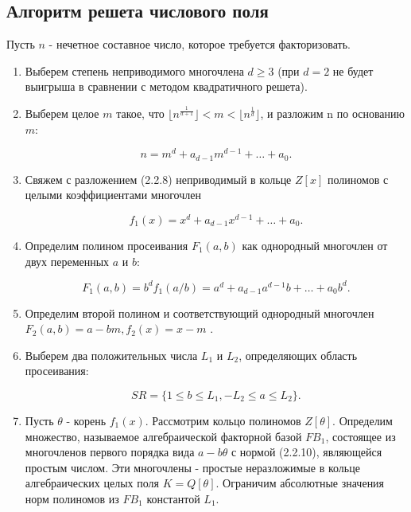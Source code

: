   \subsection{Алгоритм решета числового поля}
  Пусть {$n$} - нечетное составное число, которое требуется факторизовать.
  
    \begin{enumerate}
      \item Выберем степень неприводимого многочлена {$d \ge 3$} (при {$d = 2$} не будет выигрыша в сравнении с методом квадратичного решета).
      \item Выберем целое {$m$} такое, что {$\lfloor n^\frac{1}{d+1} \rfloor < m < \lfloor n^\frac{1}{d} \rfloor$}, и разложим n по 
	основанию {$m$}:
	
	  \begin{equation} \label{eq:prime-fact-nmd}
	   n = m^d + a_{d-1}m^{d-1} + \dots + a_0.
	  \end{equation}

      \item Свяжем с разложением (2.2.8) неприводимый в кольце {$Z[x]$} полиномов с целыми коэффициентами многочлен
      
	\begin{equation} \label{eq:prime-fact-f1xd}
	 f_1(x)=x^d + a_{d-1}x^{d-1} + \dots + a_0.
	\end{equation}

      \item Определим полином просеивания {$F_1(a,b)$} как однородный многочлен от двух переменных {$a$} и {$b$}:
      
	\begin{equation} \label{eq:prime-fact-F1ab}
	 F_1(a,b) = b^d f_1(a/b) = a^d + a_{d-1}a^{d-1}b + \dots + a_0 b^d.
	\end{equation}

      \item Определим второй полином и соответствующий однородный многочлен {$F_2(a,b)=a-bm, f_2(x)=x-m$} .
      \item Выберем два положительных числа {$L_1$} и {$L_2$}, определяющих область просеивания:
      
	\begin{equation} \label{eq:prime-fact-SR}
	 SR = \{ 1 \le b \le L_1, -L_2 \le a \le L_2 \}.
	\end{equation}

      \item Пусть {$\theta$} - корень {$f_1(x)$}. Рассмотрим кольцо полиномов {$Z[\theta]$}. Определим множество, называемое алгебраической 
	факторной базой {$FB_1$}, состоящее из многочленов первого порядка вида {$a-b\theta$} с нормой (2.2.10), являющейся простым числом. 
	Эти многочлены - простые неразложимые в кольце алгебраических целых поля {$K=Q[\theta]$}. Ограничим абсолютные значения норм 
	полиномов из {$FB_1$} константой {$L_1$}.
	

\end{enumerate}
